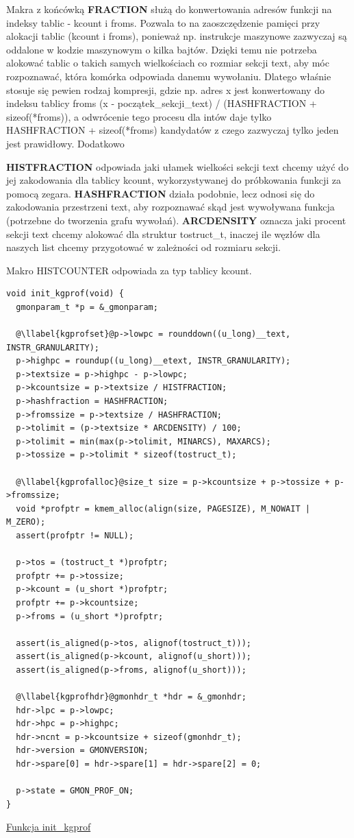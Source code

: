 \documentclass[shortabstract]{iithesis}
\makeatletter
\theoremstyle{definition} \newtheorem*{definition}{Definicja}
\theoremstyle{definition} \newtheorem*{example}{Przykład}
\theoremstyle{definition} \newtheorem*{remark}{Uwaga}
\newenvironment{longlisting}{\captionsetup{type=listing}}{}
\newcounter{llabel}[listing]%
\renewcommand*{\thellabel}{%
    \ifnum\value{llabel}<0 %
      \@ctrerr
    \else
      \ifnum\value{llabel}>10 %
        \@ctrerr
      \else
        \protect\ding{\the\numexpr\value{llabel}+201\relax}%
      \fi
    \fi
  }%
\newlength{\llabelsep}
\newcommand*{\llabel}[1]{%
  \begingroup
  \refstepcounter{llabel}%
  \label{#1}%
  \llap{\thellabel\kern\llabelsep}%
  \endgroup
}
\makeatother
\begin{document}
Makra z końcówką \textbf{FRACTION} służą do konwertowania adresów funkcji na indeksy tablic - kcount i froms. Pozwala to na zaoszczędzenie pamięci przy alokacji tablic (kcount i froms), ponieważ np. instrukcje maszynowe zazwyczaj są oddalone w kodzie maszynowym o kilka bajtów. Dzięki temu nie potrzeba alokować tablic o takich samych wielkościach co rozmiar sekcji text, aby móc rozpoznawać, która komórka odpowiada danemu wywołaniu. Dlatego właśnie stosuje się pewien rodzaj kompresji, gdzie np. adres x jest konwertowany do indeksu tablicy froms (x -  początek\_sekcji\_text) / (HASHFRACTION + sizeof(*froms)), a odwrócenie tego procesu dla intów daje tylko HASHFRACTION + sizeof(*froms) kandydatów z czego zazwyczaj tylko jeden jest prawidłowy. Dodatkowo

\textbf{HISTFRACTION} odpowiada jaki ułamek wielkości sekcji text chcemy użyć do jej zakodowania dla tablicy kcount, wykorzystywanej do próbkowania funkcji za pomocą zegara. \textbf{HASHFRACTION} działa podobnie, lecz odnosi się do zakodowania przestrzeni text, aby rozpoznawać skąd jest wywoływana funkcja (potrzebne do tworzenia grafu wywołań). \textbf{ARCDENSITY} oznacza jaki procent sekcji text chcemy alokować dla struktur tostruct\_t, inaczej ile węzłów dla naszych list chcemy przygotować w zależności od rozmiaru sekcji.

Makro HISTCOUNTER odpowiada za typ tablicy kcount.

\begin{longlisting}
  \begin{verbatim}
void init_kgprof(void) {
  gmonparam_t *p = &_gmonparam;

  @\llabel{kgprofset}@p->lowpc = rounddown((u_long)__text, INSTR_GRANULARITY);
  p->highpc = roundup((u_long)__etext, INSTR_GRANULARITY);
  p->textsize = p->highpc - p->lowpc;
  p->kcountsize = p->textsize / HISTFRACTION;
  p->hashfraction = HASHFRACTION;
  p->fromssize = p->textsize / HASHFRACTION;
  p->tolimit = (p->textsize * ARCDENSITY) / 100;
  p->tolimit = min(max(p->tolimit, MINARCS), MAXARCS);
  p->tossize = p->tolimit * sizeof(tostruct_t);

  @\llabel{kgprofalloc}@size_t size = p->kcountsize + p->tossize + p->fromssize;
  void *profptr = kmem_alloc(align(size, PAGESIZE), M_NOWAIT | M_ZERO);
  assert(profptr != NULL);

  p->tos = (tostruct_t *)profptr;
  profptr += p->tossize;
  p->kcount = (u_short *)profptr;
  profptr += p->kcountsize;
  p->froms = (u_short *)profptr;

  assert(is_aligned(p->tos, alignof(tostruct_t)));
  assert(is_aligned(p->kcount, alignof(u_short)));
  assert(is_aligned(p->froms, alignof(u_short)));

  @\llabel{kgprofhdr}@gmonhdr_t *hdr = &_gmonhdr;
  hdr->lpc = p->lowpc;
  hdr->hpc = p->highpc;
  hdr->ncnt = p->kcountsize + sizeof(gmonhdr_t);
  hdr->version = GMONVERSION;
  hdr->spare[0] = hdr->spare[1] = hdr->spare[2] = 0;

  p->state = GMON_PROF_ON;
}
  \end{verbatim}
  \caption{\href{https://mimiker.ii.uni.wroc.pl/source/xref/mimiker/sys/kern/kgprof.c?r=27b8c19a\#12}{Funkcja init\_kgprof}}
  \label{lst:funcinitkgprof}
\end{longlisting}
\end{document}
